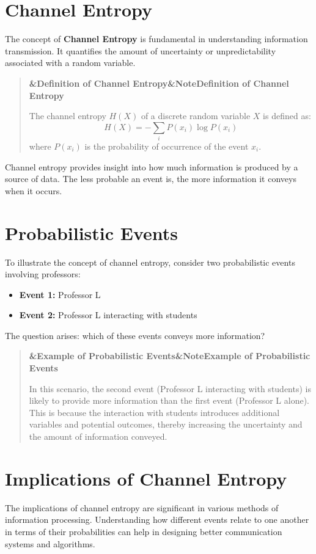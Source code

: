 \documentclass[a4paper]{article}
\newcommand{\boxheading}[1]{%
  \par\smallskip
  \noindent\textbf{\ifx&#1&Note\else#1\fi}\par
  \smallskip
}
\newenvironment{defbox}[1][]{%
  \begin{quote}\color{green!40!black}\boxheading{#1}\normalcolor
}{\end{quote}}
\newenvironment{exbox}[1][]{%
  \begin{quote}\color{brown!70!black}\boxheading{#1}\normalcolor
}{\end{quote}}
\begin{document}
\section{Channel Entropy}
The concept of \textbf{Channel Entropy} is fundamental in understanding information transmission. It quantifies the amount of uncertainty or unpredictability associated with a random variable. 

\begin{defbox}[Definition of Channel Entropy]
The channel entropy \( H(X) \) of a discrete random variable \( X \) is defined as:
\begin{equation}
H(X) = -\sum_{i} P(x_i) \log P(x_i)
\end{equation}
where \( P(x_i) \) is the probability of occurrence of the event \( x_i \).
\end{defbox}

Channel entropy provides insight into how much information is produced by a source of data. The less probable an event is, the more information it conveys when it occurs.

\section{Probabilistic Events}
To illustrate the concept of channel entropy, consider two probabilistic events involving professors:

\begin{itemize}
    \item \textbf{Event 1:} Professor L
    \item \textbf{Event 2:} Professor L interacting with students
\end{itemize}

The question arises: which of these events conveys more information? 

\begin{exbox}[Example of Probabilistic Events]
In this scenario, the second event (Professor L interacting with students) is likely to provide more information than the first event (Professor L alone). This is because the interaction with students introduces additional variables and potential outcomes, thereby increasing the uncertainty and the amount of information conveyed.
\end{exbox}

\section{Implications of Channel Entropy}
The implications of channel entropy are significant in various methods of information processing. Understanding how different events relate to one another in terms of their probabilities can help in designing better communication systems and algorithms.
\end{document}
